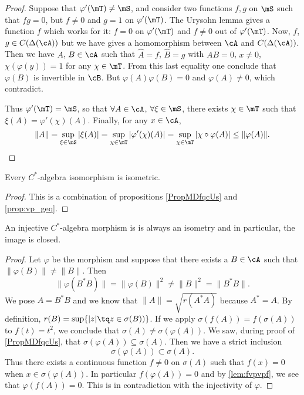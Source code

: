 \begin{proof}
Suppose that $\varphi'(\mT)\neq\mS$, and consider two functions $f,g$ on $\mS$ such that $fg=0$, but $f\neq 0$ and $g=1$ on $\varphi'(\mT)$. The Urysohn lemma gives a function $f$ which works for it: $f=0$ on $\varphi'(\mT)$ and $f\neq 0$ out of $\varphi'(\mT)$. Now, $f$, $g\in C(\Delta(\cA))$ but we have gives a homomorphism between $\cA$ and $C(\Delta(\cA))$. Then we have $A$, $B\in\cA$ such that $\hat{A}=f$,  $\hat{B}=g$ with $AB=0$, $x\neq 0$, $\chi(\varphi(y))=1$ for any $\chi\in\mT$. From this last equality one conclude that $\varphi(B)$ is invertible in $\cB$. But $\varphi(A)\varphi(B)=0$ and $\varphi(A)\neq 0$, which contradict.

Thus $\varphi'(\mT)=\mS$, so that $\forall A\in\cA$, $\forall\xi\in\mS$, there exists $\chi\in\mT$ such that $\xi(A)=\varphi'(\chi)(A)$. Finally, for any $x\in\cA$,
\begin{equation}
 \|A\|=\sup_{\xi\in\mS}|\xi(A)|
      =\sup_{\chi\in\mT}|\varphi'(\chi)(A)|
      =\sup_{\chi\in\mT}|\chi\circ\varphi(A)|
      \leq\|\varphi(A)\|.
\end{equation}

\end{proof}

\begin{proposition}
    Every \( C^*\)-algebra isomorphism is isometric.
\end{proposition}

\begin{proof}
    This is a combination of propositions \ref{PropMDfqcUs} and \ref{prop:vp_geq}.
\end{proof}

\begin{lemma}  \label{lem:injmorpisom}
An injective $C^*$-algebra morphism is is always an isometry and in particular, the image is closed.
\end{lemma}

\begin{proof}
Let $\varphi$ be the morphism and suppose that there exists a $B\in\cA$ such that $\| \varphi(B) \|\neq \| B \|$. Then
\[ 
  \| \varphi(B^*B) \|=\| \varphi(B) \|^2\neq\| B \|^2=\| B^*B \|.
\]
We pose $A=B^*B$ and we know that $\| A \|=\sqrt{r(A^*A)}$ because $A^*=A$. By definition, $r(B)=\sup\{ | z |\tq z\in\sigma(B)) \}$. If we apply $\sigma(f(A))=f(\sigma(A))$ to $f(t)=t^2$, we conclude that $\sigma(A)\neq\sigma(\varphi(A))$. We saw, during proof of \ref{PropMDfqcUs}, that $\sigma(\varphi(A))\subseteq\sigma(A)$. Then we have a strict inclusion 
\[ 
   \sigma(\varphi(A))\subset\sigma(A).
\]
Thus there exists a continuous function $f\neq 0$ on $\sigma(A)$ such that $f(x)=0$ when $x\in\sigma(\varphi(A))$. In particular $f(\varphi(A))=0$ and by \ref{lem:fvpvpf}, we see that $\varphi(f(A))=0$. This is in contradiction with the injectivity of $\varphi$. 

\end{proof}

